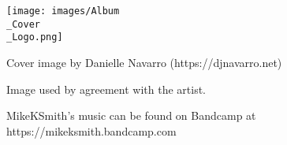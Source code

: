 \documentclass[
  12pt,
  letterpaper,
  oneside,
  open=any]{scrbook}
\begin{document}
\begin{frontmatter}
\begin{titlepage}
\newcommand{\titlepagefooterblock}{
\footerstyled
}

\newcommand{\titlepagedateblock}{
\datestyled
}

\newcommand{\titleblock}{{

{\titlepagetitleblock}
}

\vspace{1.5cm}
}

\newcommand{\authorblock}{{\titlepageauthorblock}

\vspace{2\baselineskip}
}

\newcommand{\affiliationblock}{{\titlepageaffiliationblock}

\vspace{2\baselineskip}
}

\newcommand{\logoblock}{{\texttt{[image: images/Album\\\_Cover\\\_Logo.png]}}

\vspace{1cm}
}

\newcommand{\footerblock}{}

\newcommand{\dateblock}{}

\newcommand{\headerblock}{}

\thispagestyle{empty} %


\newlength{\minipagewidth}
\setlength{\minipagewidth}{\textwidth}
\raggedright %
\begin{minipage}[b][\textheight][s]{\minipagewidth}
\titlepagepagealign
\vspace{1.0cm}

\titleblock

\authorblock

\vfill

\logoblock

Cover image by Danielle Navarro (https://djnavarro.net)

Image used by agreement with the artist.

MikeKSmith's music can be found on Bandcamp at
https://mikeksmith.bandcamp.com

\vspace{0.8cm}

\footerblock
\par

\end{minipage}
\clearpage
\restoregeometry
\end{titlepage}
\setcounter{page}{1}
\end{frontmatter}
\end{document}
